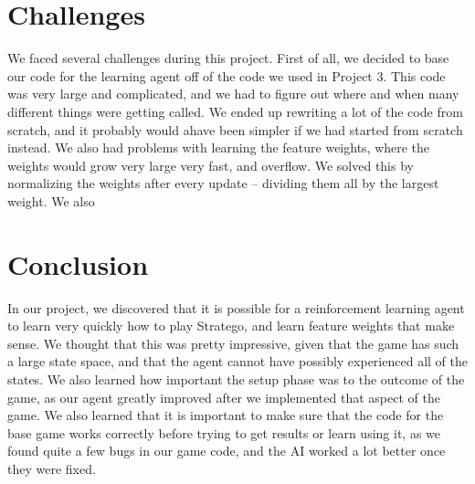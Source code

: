\documentclass[letterpaper]{article}
\begin{document}

\section{Challenges}
We faced several challenges during this project. First of all, we decided to base our code for the learning agent off of the code we used in Project 3. This code was very large and complicated, and we had to figure out where and when many different things were getting called. We ended up rewriting a lot of the code from scratch, and it probably would ahave been simpler if we had started from scratch instead. We also had problems with learning the feature weights, where the weights would grow very large very fast, and overflow. We solved this by normalizing the weights after every update -- dividing them all by the largest weight. We also 

\section{Conclusion}
In our project, we discovered that it is possible for a reinforcement learning agent to learn very quickly how to play Stratego, and learn feature weights that make sense. We thought that this was pretty impressive, given that the game has such a large state space, and that the agent cannot have possibly experienced all of the states. We also learned how important the setup phase was to the outcome of the game, as our agent greatly improved after we implemented that aspect of the game. We also learned that it is important to make sure that the code for the base game works correctly before trying to get results or learn using it, as we found quite a few bugs in our game code, and the AI worked a lot better once they were fixed.
\\
\end{document}
